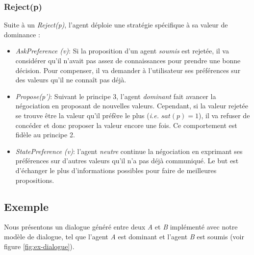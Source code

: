 	\subsubsection{Reject(p)}
	
	Suite à un \emph{Reject(p)}, l'agent déploie une stratégie spécifique à sa valeur de dominance :
	\begin{itemize}
		\item \emph{AskPreference (v)}: Si la proposition d'un agent \emph{soumis} est rejetée, il va considérer qu'il n'avait pas assez de connaissances pour prendre une bonne décision. Pour compenser, il va demander à l'utilisateur ses préférences sur des valeurs qu'il ne connaît pas déjà. 
		
		\item \emph{Propose(p')}: Suivant le principe 3, l'agent \emph{dominant} fait avancer la négociation en proposant de nouvelles valeurs. Cependant, si la valeur rejetée se trouve être la valeur qu'il préfère le plus (\textit{i.e.} $sat(p) =1$), il va refuser de concéder et donc proposer la valeur encore une fois. Ce comportement est fidèle au principe 2. 
		
		\item \emph{StatePreference (v)}: l'agent \emph{neutre} continue la négociation en exprimant ses préférences sur d'autres valeurs qu'il n'a pas déjà communiqué. Le but est d'échanger le plus d'informations possibles pour faire de meilleures propositions. 
	\end{itemize}	
	
	\subsection{Exemple}
	Nous présentons un dialogue généré entre deux \textit{A} et \textit{B} implémenté avec notre modèle de dialogue, tel que l'agent \textit{A} est dominant et l'agent \textit{B} est soumis (voir figure \ref{fig:ex-dialogue}). 

